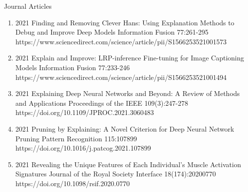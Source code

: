 \documentclass[10pt,a4paper]{article} %
\begin{document}
\headedsection %
{Journal Articles}{ }
{
\begin{enumerate}

    \item[] 
                        {2021}
                        {Finding and Removing Clever Hans: Using Explanation Methods to Debug and Improve Deep Models}
                        {Information Fusion}
                        {77:261-295}
                        {https://www.sciencedirect.com/science/article/pii/S1566253521001573}


    \item[] 
                       {2021}
                       {Explain and Improve: LRP-inference Fine-tuning for Image Captioning Models}
                       {Information Fusion}
                       {77:233-246}
                       {https://www.sciencedirect.com/science/article/pii/S1566253521001494}

    \item[] 
                        {2021}
                        {Explaining Deep Neural Networks and Beyond: A Review of Methods and Applications}
                        {Proceedings of the IEEE}
                        {109(3):247-278}
                        {https://doi.org/10.1109/JPROC.2021.3060483}

    \item[] 
                        {2021}
                        {Pruning by Explaining: A Novel Criterion for Deep Neural Network Pruning}
                        {Pattern Recognition}
                        {115:107899}
                        {https://doi.org/10.1016/j.patcog.2021.107899}

    \item[] 
                        {2021}
                        {Revealing the Unique Features of Each Individual's Muscle Activation Signatures}
                        {Journal of the Royal Society Interface}
                        {18(174):20200770}
                        {https://doi.org/10.1098/rsif.2020.0770}


\end{enumerate}}
\end{document}
